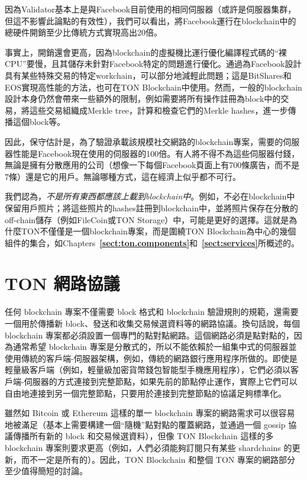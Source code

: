 \documentclass[12pt,oneside]{article}
\def\refpoint#1{{\rm\textbf{\ref{#1}}}}
\let\ptref=\refpoint
\def\mysection#1{\section{#1}\fancyhead[C]{\textsc{Chapter \textbf{\thesection.} #1}}}
\begin{document}
因為Validator基本上是與Facebook目前使用的相同伺服器（或許是伺服器集群，但這不影響此論點的有效性），我們可以看出，將Facebook運行在blockchain中的總硬件開銷至少比傳統方式實現高出20倍。

事實上，開銷還會更高，因為blockchain的虛擬機比運行優化編譯程式碼的“裸CPU”要慢，且其儲存未針對Facebook特定的問題進行優化。通過為Facebook設計具有某些特殊交易的特定workchain，可以部分地減輕此問題；這是BitShares和EOS實現高性能的方法，也可在TON Blockchain中使用。然而，一般的blockchain設計本身仍然會帶來一些額外的限制，例如需要將所有操作註冊為block中的交易，將這些交易組織成Merkle tree，計算和檢查它們的Merkle hashes，進一步傳播這個block等。

因此，保守估計是，為了驗證承載該規模社交網路的blockchain專案，需要的伺服器性能是Facebook現在使用的伺服器的100倍。有人將不得不為這些伺服器付錢，無論是擁有分散應用的公司（想像一下每個Facebook頁面上有700條廣告，而不是7條）還是它的用戶。無論哪種方式，這在經濟上似乎都不可行。

我們認為，{\em 不是所有東西都應該上載到blockchain中}。例如，不必在blockchain中保留用戶照片；將這些照片的hashes註冊到blockchain中，並將照片保存在分散的off-chain儲存（例如FileCoin或TON Storage）中，可能是更好的選擇。這就是為什麼TON不僅僅是一個blockchain專案，而是圍繞TON Blockchain為中心的幾個組件的集合，如Chapters~\ptref{sect:ton.components}和~\ptref{sect:services}所概述的。


%
%
%
%

\clearpage
\mysection{TON 網路協議}\label{sect:network}

任何 blockchain 專案不僅需要 block 格式和 blockchain 驗證規則的規範，還需要一個用於傳播新 block、發送和收集交易候選資料等的網路協議。換句話說，每個 blockchain 專案都必須設置一個專門的點對點網路。這個網路必須是點對點的，因為通常希望 blockchain 專案是分散式的，所以不能依賴於一組集中式的伺服器並使用傳統的客戶端-伺服器架構，例如，傳統的網路銀行應用程序所做的。即使是輕量級客戶端（例如，輕量級加密貨幣錢包智能型手機應用程序），它們必須以客戶端-伺服器的方式連接到完整節點，如果先前的節點停止運作，實際上它們可以自由地連接到另一個完整節點，只要用於連接到完整節點的協議足夠標準化。

雖然如 Bitcoin 或 Ethereum 這樣的單一 blockchain 專案的網路需求可以很容易地被滿足（基本上需要構建一個“隨機”點對點的覆蓋網路，並通過一個 gossip 協議傳播所有新的 block 和交易候選資料），但像 TON Blockchain 這樣的多 blockchain 專案則要求更高（例如，人們必須能夠訂閱只有某些 shardchains 的更新，而不一定是所有的）。因此，TON Blockchain 和整個 TON 專案的網路部分至少值得簡短的討論。
\end{document}
